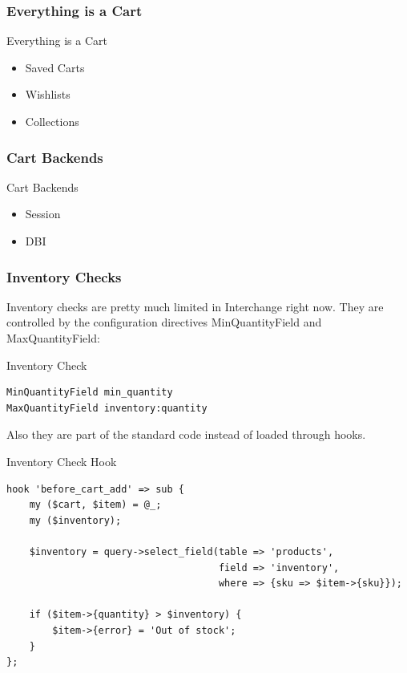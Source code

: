 \subsubsection{Everything is a Cart}
\begin{frame}{Everything is a Cart}
\begin{itemize}
\item Saved Carts
\item Wishlists
\item Collections
\end{itemize}
\end{frame}

\subsubsection{Cart Backends}
\begin{frame}{Cart Backends}
\begin{itemize}
\item Session
\item DBI
\end{itemize}
\end{frame}

\subsubsection{Inventory Checks}
Inventory checks are pretty much limited in Interchange right now.
They are controlled by the configuration directives MinQuantityField
and MaxQuantityField:
\begin{frame}[fragile]{Inventory Check}
\begin{lstlisting}
MinQuantityField min_quantity
MaxQuantityField inventory:quantity 
\end{lstlisting}
\end{frame}
Also they are part of the standard code instead of loaded through
hooks.

\begin{frame}[fragile]{Inventory Check Hook}
\begin{lstlisting}
hook 'before_cart_add' => sub {
    my ($cart, $item) = @_;
    my ($inventory);

    $inventory = query->select_field(table => 'products',
                                     field => 'inventory',
                                     where => {sku => $item->{sku}});
				     
    if ($item->{quantity} > $inventory) {
        $item->{error} = 'Out of stock';
    }
};
\end{lstlisting}
\end{frame}

